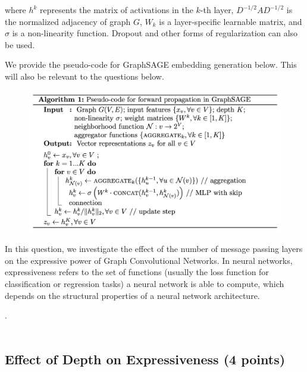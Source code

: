 \documentclass{article}
\numberwithin{figure}{section}
\begin{document}
	where $h^k$ represents the matrix of activations in the $k$-th layer, $D^{-1/2}AD^{-1/2}$ is the normalized adjacency of graph $G$, $W_k$ is a layer-specific learnable matrix, and $\sigma$ is a non-linearity function. Dropout and other forms of regularization can also be used.
	
	We provide the pseudo-code for GraphSAGE embedding generation below. This will also be relevant to the questions below.
	
	\begin{figure}[H]
		\centering
		\includegraphics[width=1\columnwidth]{algorithm.png}
	\end{figure}
	
	In this question, we investigate the effect of the number of message passing layers on the expressive power of Graph Convolutional Networks. In neural networks, expressiveness refers to the set of functions (usually the loss function for classification or regression tasks) a neural network is able to compute, which depends on the structural properties of a neural network architecture.
	
	.\\\\
	\subsection{Effect of Depth on Expressiveness (4 points)}
	
\end{document}
